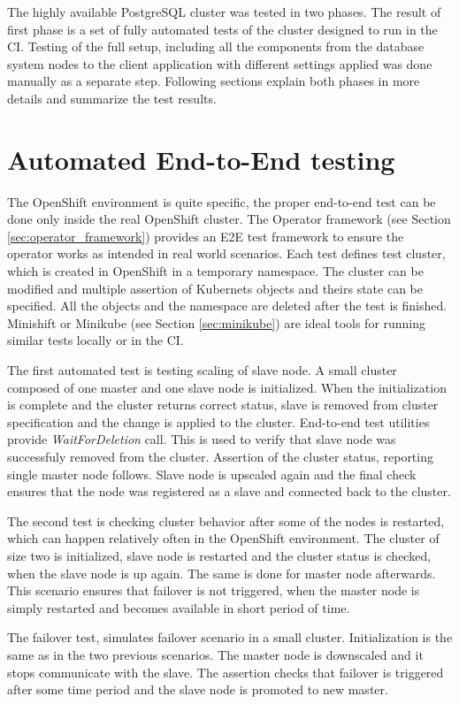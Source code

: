 \documentclass[
  digital, %
  twoside, %
  table,   %
  lof,     %
  lot,     %
]{fithesis3}
\begin{document}
The highly available PostgreSQL cluster was tested in two phases. The result of first phase is a set of fully automated tests of the cluster designed to run in the CI. Testing of the full setup, including all the components from the database system nodes to the client application with different settings applied was done manually as a separate step. Following sections explain both phases in more details and summarize the test results.

\section{Automated End-to-End testing}
The OpenShift environment is quite specific, the proper end-to-end test can be done only inside the real OpenShift cluster. The Operator framework (see Section \ref{sec:operator_framework}) provides an E2E test framework to ensure the operator works as intended in real world scenarios. Each test defines test cluster, which is created in OpenShift in a temporary namespace. The cluster can be modified and multiple assertion of Kubernets objects and theirs state can be specified. All the objects and the namespace are deleted after the test is finished. Minishift or Minikube (see Section \ref{sec:minikube}) are ideal tools for running similar tests locally or in the CI.

The first automated test is testing scaling of slave node. A small cluster composed of one master and one slave node is initialized. When the initialization is complete and the cluster returns correct status, slave is removed from cluster specification and the change is applied to the cluster. End-to-end test utilities provide \textit{WaitForDeletion} call. This is used to verify that slave node was successfuly removed from the cluster. Assertion of the cluster status, reporting single master node follows.  Slave node is upscaled again and the final check ensures that the node was registered as a slave and connected back to the cluster.

The second test is checking cluster behavior after some of the nodes is restarted, which can happen relatively often in the OpenShift environment. The cluster of size two is initialized, slave node is restarted and the cluster status is checked, when the slave node is up again. The same is done for master node afterwards. This scenario ensures that failover is not triggered, when the master node is simply restarted and becomes available in short period of time.

The failover test, simulates failover scenario in a small cluster. Initialization is the same as in the two previous scenarios. The master node is downscaled and it stops communicate with the slave. The assertion checks that failover is triggered after some time period and the slave node is promoted to new master.
\end{document}
